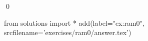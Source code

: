 
\begin{ex} 
  \label{ex:ram0}
  
  \qed
\end{ex} 
\begin{python0}
from solutions import *
add(label="ex:ram0",
    srcfilename='exercises/ram0/answer.tex') 
\end{python0}
